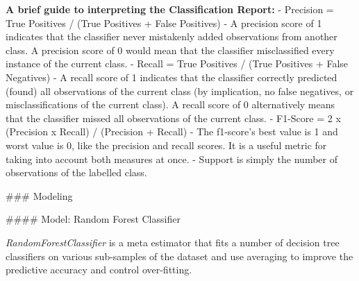 \documentclass[11pt]{article}
\begin{document}
    \textbf{A brief guide to interpreting the Classification Report:} -
Precision = True Positives / (True Positives + False Positives) - A
precision score of 1 indicates that the classifier never mistakenly
added observations from another class. A precision score of 0 would mean
that the classifier misclassified every instance of the current class. -
Recall = True Positives / (True Positives + False Negatives) - A recall
score of 1 indicates that the classifier correctly predicted (found) all
observations of the current class (by implication, no false negatives,
or misclassifications of the current class). A recall score of 0
alternatively means that the classifier missed all observations of the
current class. - F1-Score = 2 x (Precision x Recall) / (Precision +
Recall) - The f1-score's best value is 1 and worst value is 0, like the
precision and recall scores. It is a useful metric for taking into
account both measures at once. - Support is simply the number of
observations of the labelled class.

     \#\#\# Modeling

     \#\#\#\# Model: Random Forest Classifier

\emph{RandomForestClassifier} is a meta estimator that fits a number of
decision tree classifiers on various sub-samples of the dataset and use
averaging to improve the predictive accuracy and control over-fitting.
\end{document}
